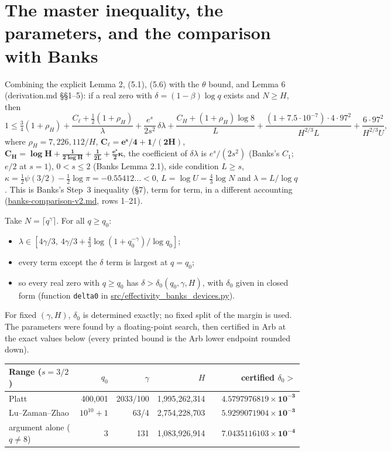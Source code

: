 \documentclass[11pt]{article}
\begin{document}
\section{The master inequality, the parameters, and the comparison with Banks}\label{sec:direct}

Combining the explicit Lemma 2, (5.1), (5.6) with the $\theta$ bound, and Lemma 6 (derivation.md \S\S1--5): if a real zero with $\delta=(1-\beta)\log q$ exists and $N\ge H$, then
\[
1 \le \tfrac34(1+\rho_H) + \frac{C_\ell+\frac12(1+\rho_H)}{\lambda} + \frac{e^s}{2s^2}\,\delta\lambda + \frac{C_H+(1+\rho_H)\log 8}{L} + \frac{(1+7.5\cdot10^{-7})\cdot 4\cdot 97^2}{H^{2/3}L} + \frac{6\cdot 97^2}{H^{2/3}U},
\]
where $\rho_H = 7{,}226{,}112/H$, $\mathbf{C_\ell = e^s/4 + 1/(2H)}$, $\mathbf{C_H = \log H + \frac{1}{2\log H} + \frac{1}{2L} + \frac{e^s}{2}\kappa}$, the coefficient of $\delta\lambda$ is $e^s/(2s^2)$ (Banks's $C_1$; $e/2$ at $s=1$), $0<s\le2$ (Banks Lemma 2.1), side condition $L\ge s$, $\kappa = \tfrac12\psi(3/2) - \tfrac12\log\pi = -0.55412\ldots < 0$, $L = \log U = \tfrac43\log N$ and $\lambda = L/\log q$.
This is Banks's Step~3 inequality (\S7), term for term, in a different accounting (\url{banks-comparison-v2.md}, rows 1--21).

Take $N=\lceil q^\gamma\rceil$. For all $q\ge q_0$:
\begin{itemize}
\item $\lambda\in[4\gamma/3,\ 4\gamma/3 + \tfrac43\log(1+q_0^{-\gamma})/\log q_0]$;
\item every term except the $\delta$ term is largest at $q=q_0$;
\item so every real zero with $q\ge q_0$ has $\delta>\delta_0(q_0,\gamma,H)$, with $\delta_0$ given in closed form (function \texttt{delta0} in \url{src/effectivity_banks_devices.py}).
\end{itemize}
For fixed $(\gamma,H)$, $\delta_0$ is determined exactly; no fixed split of the margin is used. The parameters were found by a floating-point search, then certified in Arb at the exact values below (every printed bound is the Arb lower endpoint rounded down).

\begin{center}
\begin{tabular}{@{}lrrrlr@{}}
\toprule
Range ($s=3/2$) & $q_0$ & $\gamma$ & $H$ & & certified $\delta_0 >$\\
\midrule
Platt & 400{,}001 & 2033/100 & 1{,}995{,}262{,}314 & & $\mathbf{4.5797976819\times10^{-3}}$\\
Lu--Zaman--Zhao & $10^{10}+1$ & 63/4 & 2{,}754{,}228{,}703 & & $\mathbf{5.9299071904\times10^{-3}}$\\
argument alone ($q\ne8$) & 3 & 131 & 1{,}083{,}926{,}914 & & $\mathbf{7.0435116103\times10^{-4}}$\\
\bottomrule
\end{tabular}
\end{center}
\end{document}
